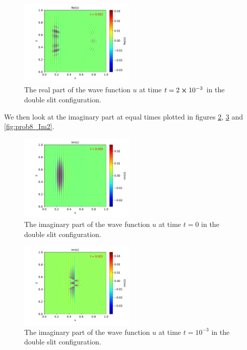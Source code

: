 \documentclass[english,notitlepage,reprint,nofootinbib]{revtex4-2}  %
\begin{document}
	\begin{figure}[h!]
		\centering
		\includegraphics[width=0.49\textwidth]{figures/problem8_U_Re_0.002.pdf}
		\caption{The real part of the wave function $u$ at time $t = 2\cross10^{-3}$ in the double slit configuration.}
		\label{fig:prob8_Re2}
	\end{figure}
	We then look at the imaginary part at equal times plotted in figures \ref{fig:prob8_Im0}, \ref{fig:prob8_Im1}
	and \ref{fig:prob8_Im2}.
	\begin{figure}[h!]
		\centering
		\includegraphics[width=0.49\textwidth]{figures/problem8_U_Im_0.000.pdf}
		\caption{The imaginary part of the wave function $u$ at time $t = 0$ in the double slit configuration.}
		\label{fig:prob8_Im0}
	\end{figure}
	
	\begin{figure}[h!]
		\centering
		\includegraphics[width=0.49\textwidth]{figures/problem8_U_Im_0.001.pdf}
		\caption{The imaginary part of the wave function $u$ at time $t = 10^{-3}$ in the double slit configuration.}
		\label{fig:prob8_Im1}
	\end{figure}
	
\end{document}
